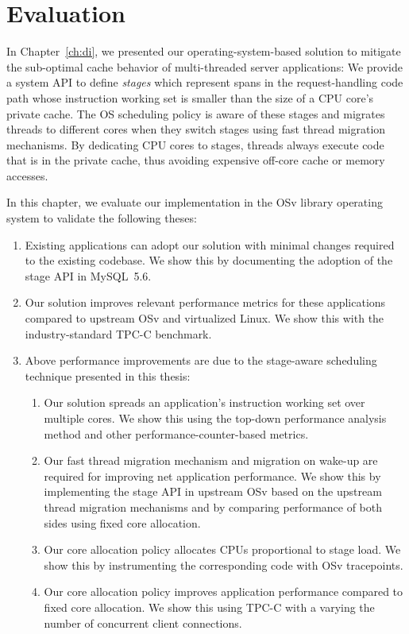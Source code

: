 \documentclass[12pt,a4paper]{book}
\begin{document}
\chapter{Evaluation}\label{ch:eval}
In Chapter~\ref{ch:di}, we presented our operating-system-based solution to mitigate the sub-optimal cache behavior of multi-threaded server applications:
We provide a system API to define \emph{stages} which represent spans in the request-handling code path whose instruction working set is smaller than the size of a CPU core's private cache.
The OS scheduling policy is aware of these stages and migrates threads to different cores when they switch stages using fast thread migration mechanisms.
By dedicating CPU cores to stages, threads always execute code that is in the private cache, thus avoiding expensive off-core cache or memory accesses.

In this chapter, we evaluate our implementation in the OSv library operating system to validate the following theses:
\begin{enumerate}
    \item Existing applications can adopt our solution with minimal changes required to the existing codebase.
        We show this by documenting the adoption of the stage API in MySQL~5.6.
    \item Our solution improves relevant performance metrics for these applications compared to upstream OSv and virtualized Linux.
        We show this with the industry-standard TPC-C benchmark.
    \item Above performance improvements are due to the stage-aware scheduling technique presented in this thesis:
    \begin{enumerate}
        \item Our solution spreads an application's instruction working set over multiple cores.
            We show this using the top-down performance analysis method and other performance-counter-based metrics.
        \item Our fast thread migration mechanism and migration on wake-up are required for improving net application performance.
            We show this by implementing the stage API in upstream OSv based on the upstream thread migration mechanisms and by comparing performance of both sides using fixed core allocation.
        \item Our core allocation policy allocates CPUs proportional to stage load.
            We show this by instrumenting the corresponding code with OSv tracepoints.
        \item Our core allocation policy improves application performance compared to fixed core allocation.
            We show this using TPC-C with a varying the number of concurrent client connections.
    \end{enumerate}
\end{enumerate}
\end{document}

